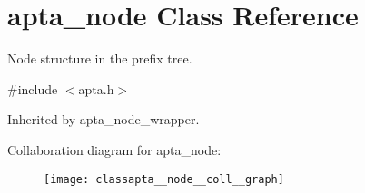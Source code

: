 \hypertarget{classapta__node}{}\section{apta\+\_\+node Class Reference}
\label{classapta__node}


Node structure in the prefix tree.  




{\ttfamily \#include $<$apta.\+h$>$}



Inherited by apta\+\_\+node\+\_\+wrapper.



Collaboration diagram for apta\+\_\+node\+:
\nopagebreak
\begin{figure}[H]
\begin{center}
\leavevmode
\texttt{[image: classapta\_\_node\_\_coll\_\_graph]}
\end{center}
\end{figure}

